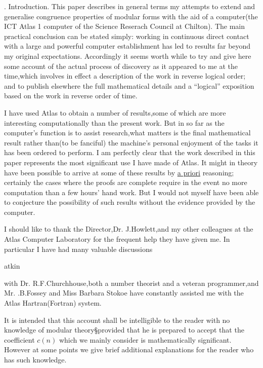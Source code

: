 . Introduction. This paper describes in general terms my attempts to extend and generalise congruence properties of modular forms with the aid of a computer(the ICT Atlas 1 computer of the Science Reserach Council at Chilton). The main practical conclusion can be stated simply: working in continuous direct contact with a large and powerful computer establishment has led to results far beyond my original expectations. Accordingly it seems worth while to try and give here some account of the actual process of discovery as it appeared to me at the time,which involves in effect a description of the work in reverse logical order; and to publish elsewhere the full mathematical details and a ``logical'' exposition based on the work in reverse order of time.

I have used Atlas to obtain a number of results,some of which are more interesting computationally than the present work. But in so far as the computer's function is to assist research,what matters is the final mathematical result rather than(to be fanciful) the machine's personal enjoyment of the tasks it has been ordered to perform. I am perfectly clear that the work described in this paper represents the most significant use I have made of Atlas. It might in theory have been possible to arrive at some of these results by \uline{a priori} reasoning; certainly the cases where the proofs are complete require in the event no more computation than a few hours' hand work. But I would not myself have been able to conjecture the possibility of such results without the evidence provided by the computer.

I should like to thank the Director,Dr. J.Howlett,and my other colleagues at the Atlas Computer Laboratory for the frequent help they have given me. In particular I have had many valuable discussions

\noindent\hfill atkin 

\noindent with Dr. R.F.Churchhouse,both a number theorist and a veteran programmer,and Mr. .B.Fossey and Miss Barbara Stokoe have constantly assisted me with the Atlas Hartran(Fortran) system.

It is intended that this account shall be intelligible to the reader with no knowledge of modular theory\S{}\inserted{\handwritten{,}}provided that he is prepared to accept that the coefficient \uline{$c(n)$} which we mainly consider is mathematically significant. However at some points we give brief additional explanations for the reader who has such knowledge.

